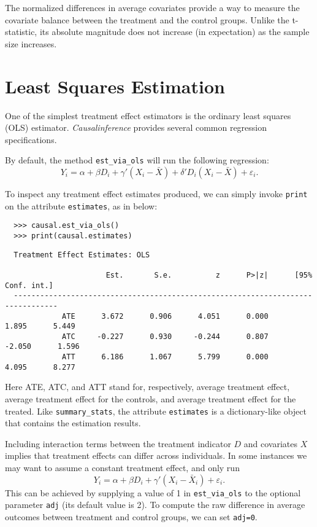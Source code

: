 \documentclass[12pt]{article}
\theoremstyle{definition}
\theoremstyle{definition}
\theoremstyle{definition}
\theoremstyle{remark}
\begin{document}
The normalized differences in average covariates provide a way to measure the covariate balance between the treatment and the control groups. Unlike the t-statistic, its absolute magnitude does not increase (in expectation) as the sample size increases.


\section{Least Squares Estimation}

One of the simplest treatment effect estimators is the ordinary least squares (OLS) estimator. \textit{Causalinference} provides several common regression specifications.

By default, the method \texttt{est\_via\_ols} will run the following regression:
\[Y_i = \alpha + \beta D_i + \gamma' (X_i-\bar{X}) + \delta' D_i (X_i-\bar{X}) + \varepsilon_i.\]

To inspect any treatment effect estimates produced, we can simply invoke \texttt{print} on the attribute \texttt{estimates}, as in below:
\begin{verbatim}
  >>> causal.est_via_ols()
  >>> print(causal.estimates)
\end{verbatim}
\begin{verbatim}
  Treatment Effect Estimates: OLS
  
                       Est.       S.e.          z      P>|z|      [95% Conf. int.]
  --------------------------------------------------------------------------------
             ATE      3.672      0.906      4.051      0.000      1.895      5.449
             ATC     -0.227      0.930     -0.244      0.807     -2.050      1.596
             ATT      6.186      1.067      5.799      0.000      4.095      8.277
\end{verbatim}
Here ATE, ATC, and ATT stand for, respectively, average treatment effect, average treatment effect for the controls, and average treatment effect for the treated. Like \texttt{summary\_stats}, the attribute \texttt{estimates} is a dictionary-like object that contains the estimation results.

Including interaction terms between the treatment indicator $D$ and covariates $X$ implies that treatment effects can differ across individuals. In some instances we may want to assume a constant treatment effect, and only run
\[Y_i = \alpha + \beta D_i + \gamma' (X_i-\bar{X}_i) + \varepsilon_i.\]
This can be achieved by supplying a value of 1 in \texttt{est\_via\_ols} to the optional parameter \texttt{adj} (its default value is 2). To compute the raw difference in average outcomes between treatment and control groups, we can set \texttt{adj=0}.
\end{document}
